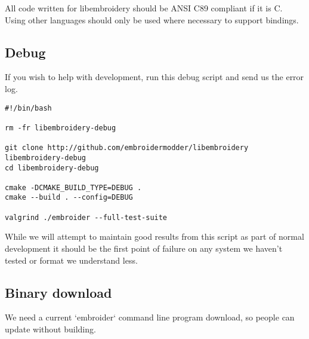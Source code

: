 All code written for libembroidery should be ANSI C89 compliant
if it is C. Using other languages should only be used where
necessary to support bindings.

\subsection{Debug}

If you wish to help with development, run this debug script and send us the error log.

\begin{lstlisting}
#!/bin/bash

rm -fr libembroidery-debug

git clone http://github.com/embroidermodder/libembroidery libembroidery-debug
cd libembroidery-debug

cmake -DCMAKE_BUILD_TYPE=DEBUG .
cmake --build . --config=DEBUG

valgrind ./embroider --full-test-suite
\end{lstlisting}

While we will attempt to maintain good results from this script as part of normal development it should be the first point of failure on any system we haven't tested or format we understand less.

\subsection{Binary download}

We need a current `embroider` command line program download, so people can update
without building.

